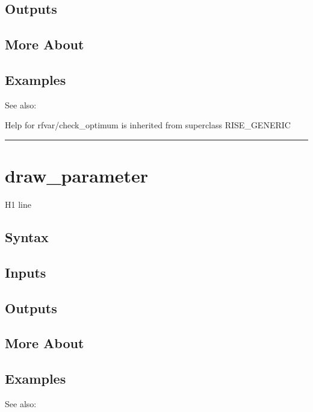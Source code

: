 \documentclass[letterpaper,10pt,english]{sphinxmanual}
\begin{document}
\subsection{Outputs}
\label{classes/models/@rfvar/rfvar:id5}

\subsection{More About}
\label{classes/models/@rfvar/rfvar:id6}

\subsection{Examples}
\label{classes/models/@rfvar/rfvar:id7}
See also:

Help for rfvar/check\_optimum is inherited from superclass RISE\_GENERIC


\bigskip\hrule{}\bigskip



\section{draw\_parameter}
\label{classes/models/@rfvar/rfvar:id8}\label{classes/models/@rfvar/rfvar:draw-parameter}
H1 line


\subsection{Syntax}
\label{classes/models/@rfvar/rfvar:id9}

\subsection{Inputs}
\label{classes/models/@rfvar/rfvar:id10}

\subsection{Outputs}
\label{classes/models/@rfvar/rfvar:id11}

\subsection{More About}
\label{classes/models/@rfvar/rfvar:id12}

\subsection{Examples}
\label{classes/models/@rfvar/rfvar:id13}
See also:
\end{document}
